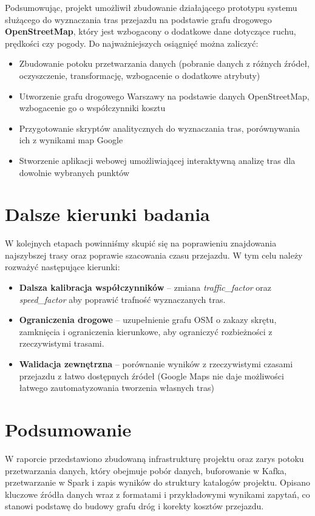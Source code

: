 \documentclass[12pt]{article}
\begin{document}
Podsumowując, projekt umożliwił zbudowanie działającego prototypu systemu służącego do wyznaczania tras przejazdu na podstawie grafu drogowego \textbf{OpenStreetMap}, który jest wzbogacony o dodatkowe dane dotyczące ruchu, prędkości czy pogody. Do najważniejszych osiągnięć można zaliczyć:
\begin{itemize}
    \item Zbudowanie potoku przetwarzania danych (pobranie danych z różnych źródeł, oczyszczenie, transformację, wzbogacenie o dodatkowe atrybuty)
    \item Utworzenie grafu drogowego Warszawy na podstawie danych OpenStreetMap, wzbogacenie go o współczynniki kosztu
    \item Przygotowanie skryptów analitycznych do wyznaczania tras, porównywania ich z wynikami map Google
    \item Stworzenie aplikacji webowej umożliwiającej interaktywną analizę tras dla dowolnie wybranych punktów
\end{itemize}
\section{Dalsze kierunki badania}
W kolejnych etapach powinniśmy skupić się na poprawieniu znajdowania najszybszej trasy oraz
poprawie szacowania czasu przejazdu. W tym celu należy rozważyć następujące kierunki:
\begin{itemize}
    \item \textbf{Dalsza kalibracja współczynników} -- zmiana \textit{traffic\_factor} oraz
    \textit{speed\_factor} aby poprawić trafność wyznaczanych tras.
    \item \textbf{Ograniczenia drogowe} -- uzupełnienie grafu OSM o zakazy skrętu,
    zamknięcia i ograniczenia kierunkowe, aby ograniczyć rozbieżności z rzeczywistymi trasami.
    \item \textbf{Walidacja zewnętrzna} -- porównanie wyników z rzeczywistymi czasami przejazdu z łatwo dostępnych źródeł (Google Maps nie daje możliwości łatwego zautomatyzowania tworzenia własnych tras)
\end{itemize}


\section{Podsumowanie}

W raporcie przedstawiono zbudowaną infrastrukturę projektu oraz zarys potoku przetwarzania danych,
który obejmuje pobór danych, buforowanie w Kafka, przetwarzanie w Spark i zapis wyników do
struktury katalogów projektu. Opisano kluczowe źródła danych wraz z formatami i przykładowymi 
wynikami zapytań, co stanowi podstawę do budowy grafu dróg i korekty kosztów przejazdu.
\end{document}
